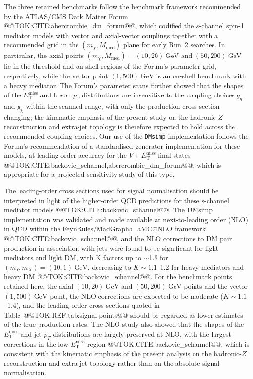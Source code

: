 \documentclass[11pt]{article}
\newcommand{\GeV}{\text{GeV}}
\newcommand{\MET}{\ensuremath{E_{\mathrm{T}}^{\mathrm{miss}}}}
\begin{document}
The three retained benchmarks follow the benchmark framework recommended by
the ATLAS/CMS Dark Matter Forum @@TOK:CITE:abercrombie_dm_forum@@, which
codified the $s$-channel spin-1 mediator models with vector and axial-vector
couplings together with a recommended grid in the
$(m_\chi, M_{\mathrm{med}})$ plane for early Run~2 searches. In
particular, the axial points $(m_\chi, M_{\mathrm{med}}) = (10, 20)~\GeV$
and $(50, 200)~\GeV$ lie in the threshold and on-shell regions of the
Forum's parameter grid, respectively, while the vector point
$(1, 500)~\GeV$ is an on-shell benchmark with a heavy mediator. The Forum's
parameter scans further showed that the shapes of the \MET{} and boson
$p_T$ distributions are insensitive to the coupling choices $g_q$ and
$g_\chi$ within the scanned range, with only the production cross section
changing; the kinematic emphasis of the present study on the hadronic-$Z$
reconstruction and extra-jet topology is therefore expected to hold across
the recommended coupling choices. Our use of the \texttt{DMsimp}
implementation follows the Forum's recommendation of a standardised
generator implementation for these models, at leading-order accuracy for
the $V + \MET$ final states @@TOK:CITE:backovic_schannel,abercrombie_dm_forum@@,
which is appropriate for a projected-sensitivity study of this type.

The leading-order cross sections used for signal normalisation should be
interpreted in light of the higher-order QCD predictions for these
s-channel mediator models @@TOK:CITE:backovic_schannel@@. The DMsimp
implementation was validated and made available at next-to-leading order
(NLO) in QCD within the FeynRules/MadGraph5\_aMC@NLO framework
@@TOK:CITE:backovic_schannel@@, and the NLO corrections to DM pair production in
association with jets were found to be significant for light mediators and
light DM, with K factors up to $\sim$1.8 for $(m_Y, m_X) = (10, 1)~\GeV$,
decreasing to $K \sim 1.1$--1.2 for heavy mediators and heavy DM
@@TOK:CITE:backovic_schannel@@. For the benchmark points retained here, the
axial $(10, 20)~\GeV$ and $(50, 200)~\GeV$ points and the vector
$(1, 500)~\GeV$ point, the NLO corrections are expected to be moderate
($K \sim 1.1$--1.4), and the leading-order cross sections quoted in
Table~@@TOK:REF:tab:signal-points@@ should be regarded as lower estimates of the
true production rates. The NLO study also showed that the shapes of the
\MET{} and jet $p_T$ distributions are largely preserved at NLO, with the
largest corrections in the low-\MET{} region @@TOK:CITE:backovic_schannel@@,
which is consistent with the kinematic emphasis of the present analysis on
the hadronic-$Z$ reconstruction and extra-jet topology rather than on the
absolute signal normalisation.
\end{document}
